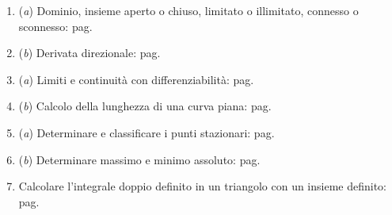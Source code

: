 \documentclass[a4paper]{article}
\begin{document}
\begin{itemize}
\begin{itemize}
\begin{itemize}
\begin{enumerate}[label*=Ex. \arabic*), leftmargin = 4em]
					\item (\emph{a}) Dominio, insieme aperto o chiuso, limitato o illimitato, connesso o sconnesso: pag.~\hyperlink{
						exam: esame 10 luglio 2023 - Gruppo A - 3 esercizio (a)
					}{
					}

					\setcounter{enumi}{2}
					
					\item (\emph{b}) Derivata direzionale: pag.~\hyperlink{
						exam: esame 10 luglio 2023 - Gruppo A - 3 esercizio (b)
					}{
					}
					
					\item (\emph{a}) Limiti e continuità con differenziabilità: pag.~\hyperlink{
						exam: esame 10 luglio 2023 - Gruppo A - 4 esercizio (a)	
					}{
					}

					\setcounter{enumi}{3}
					
					\item (\emph{b}) Calcolo della lunghezza di una curva piana: pag.~\hyperlink{
						exam: esame 10 luglio 2023 - Gruppo A - 4 esercizio (b)
					}{
					}

					\item \vspace{-1.1em}(\emph{a}) Determinare e classificare i punti stazionari:\newline%
					pag.~\hyperlink{
						exam: esame 10 luglio 2023 - Gruppo A - 5 esercizio (a)
					}{
					}

					\setcounter{enumi}{4}

					\item (\emph{b}) Determinare massimo e minimo assoluto: pag.~\hyperlink{
						exam: esame 10 luglio 2023 - Gruppo A - 5 esercizio (b)
					}{
					}

					\item Calcolare l'integrale doppio definito in un triangolo con un insieme definito: pag.~\hyperlink{
						exam: esame 10 luglio 2023 - Gruppo A - 6 esercizio
					}{
					}


\end{enumerate}
\end{itemize}
\end{itemize}
\end{itemize}
\end{document}
